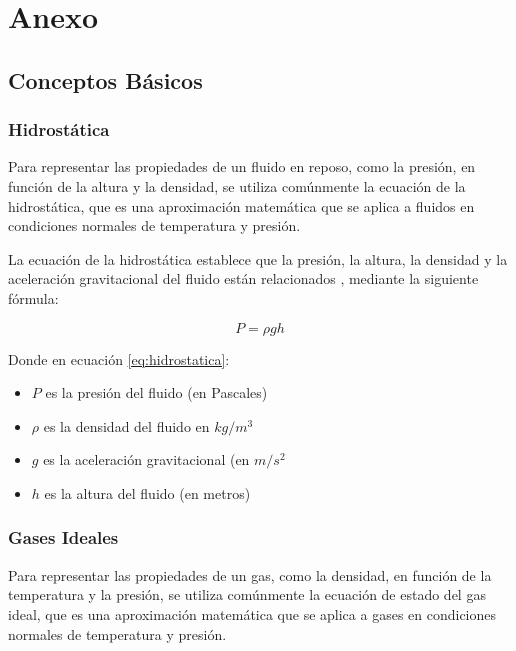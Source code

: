 \chapter{Anexo} \label{chp:anexo}

\section{Conceptos Básicos}

\subsection{Hidrostática} \label{chp:anexo:hidrostatica}

Para representar las propiedades de un fluido en reposo, como la presión, en función de la altura y la densidad, se utiliza comúnmente la ecuación de la hidrostática, que es una aproximación matemática que se aplica a fluidos en condiciones normales de temperatura y presión.

La ecuación de la hidrostática establece que la presión, la altura, la densidad y la aceleración gravitacional del fluido están relacionados \cite{libro_fisica_giancoli}, mediante la siguiente fórmula:

\begin{equation}
    \label{eq:hidrostatica}
    P=\rho gh 
\end{equation}

Donde en ecuación \ref{eq:hidrostatica}:

\begin{itemize}
    \item $P$ es la presión del fluido (en Pascales)
    \item $\rho$ es la densidad del fluido en $kg/m^{3}$   
    \item $g$ es la aceleración gravitacional (en $m/s^{2}$
    \item $h$ es la altura del fluido (en metros)
\end{itemize}

\newpage

\subsection{Gases Ideales} \label{chp:anexo:gases_ideales}

Para representar las propiedades de un gas, como la densidad, en función de la temperatura y la presión, se utiliza comúnmente la ecuación de estado del gas ideal, que es una aproximación matemática que se aplica a gases en condiciones normales de temperatura y presión.

